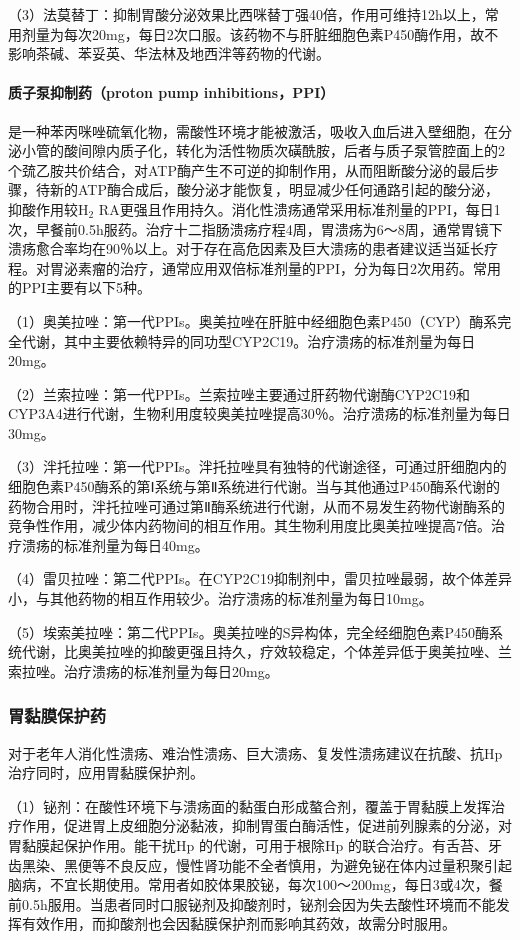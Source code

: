 （3）法莫替丁：抑制胃酸分泌效果比西咪替丁强40倍，作用可维持12h以上，常用剂量为每次20mg，每日2次口服。该药物不与肝脏细胞色素P450酶作用，故不影响茶碱、苯妥英、华法林及地西泮等药物的代谢。
\paragraph{质子泵抑制药（proton pump inhibitions，PPI）}

是一种苯丙咪唑硫氧化物，需酸性环境才能被激活，吸收入血后进入壁细胞，在分泌小管的酸间隙内质子化，转化为活性物质次磺酰胺，后者与质子泵管腔面上的2个巯乙胺共价结合，对ATP酶产生不可逆的抑制作用，从而阻断酸分泌的最后步骤，待新的ATP酶合成后，酸分泌才能恢复，明显减少任何通路引起的酸分泌，抑酸作用较H$_2$
RA更强且作用持久。消化性溃疡通常采用标准剂量的PPI，每日1次，早餐前0.5h服药。治疗十二指肠溃疡疗程4周，胃溃疡为6～8周，通常胃镜下溃疡愈合率均在90％以上。对于存在高危因素及巨大溃疡的患者建议适当延长疗程。对胃泌素瘤的治疗，通常应用双倍标准剂量的PPI，分为每日2次用药。常用的PPI主要有以下5种。

（1）奥美拉唑：第一代PPIs。奥美拉唑在肝脏中经细胞色素P450（CYP）酶系完全代谢，其中主要依赖特异的同功型CYP2C19。治疗溃疡的标准剂量为每日20mg。

（2）兰索拉唑：第一代PPIs。兰索拉唑主要通过肝药物代谢酶CYP2C19和CYP3A4进行代谢，生物利用度较奥美拉唑提高30％。治疗溃疡的标准剂量为每日30mg。

（3）泮托拉唑：第一代PPIs。泮托拉唑具有独特的代谢途径，可通过肝细胞内的细胞色素P450酶系的第Ⅰ系统与第Ⅱ系统进行代谢。当与其他通过P450酶系代谢的药物合用时，泮托拉唑可通过第Ⅱ酶系统进行代谢，从而不易发生药物代谢酶系的竞争性作用，减少体内药物间的相互作用。其生物利用度比奥美拉唑提高7倍。治疗溃疡的标准剂量为每日40mg。

（4）雷贝拉唑：第二代PPIs。在CYP2C19抑制剂中，雷贝拉唑最弱，故个体差异小，与其他药物的相互作用较少。治疗溃疡的标准剂量为每日10mg。

（5）埃索美拉唑：第二代PPIs。奥美拉唑的S异构体，完全经细胞色素P450酶系统代谢，比奥美拉唑的抑酸更强且持久，疗效较稳定，个体差异低于奥美拉唑、兰索拉唑。治疗溃疡的标准剂量为每日20mg。

\subsubsection{胃黏膜保护药}

对于老年人消化性溃疡、难治性溃疡、巨大溃疡、复发性溃疡建议在抗酸、抗{Hp}
治疗同时，应用胃黏膜保护剂。

（1）铋剂：在酸性环境下与溃疡面的黏蛋白形成螯合剂，覆盖于胃黏膜上发挥治疗作用，促进胃上皮细胞分泌黏液，抑制胃蛋白酶活性，促进前列腺素的分泌，对胃黏膜起保护作用。能干扰{Hp}
的代谢，可用于根除{Hp}
的联合治疗。有舌苔、牙齿黑染、黑便等不良反应，慢性肾功能不全者慎用，为避免铋在体内过量积聚引起脑病，不宜长期使用。常用者如胶体果胶铋，每次100～200mg，每日3或4次，餐前0.5h服用。当患者同时口服铋剂及抑酸剂时，铋剂会因为失去酸性环境而不能发挥有效作用，而抑酸剂也会因黏膜保护剂而影响其药效，故需分时服用。

